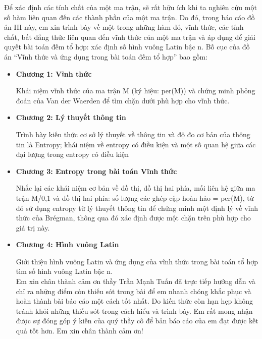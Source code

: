 \documentclass[a4paper, 12pt]{report}
\begin{document}
Để xác định các tính chất của một ma trận, sẽ rất hữu ích khi ta nghiên cứu một số hàm liên quan đến các thành phần của một ma trận. Do đó, trong báo cáo đồ án III này, em xin trình bày về một trong những hàm đó, vĩnh thức, các tính chất, bất đẳng thức liên quan đến vĩnh thức của một ma trận và áp dụng để giải quyết bài toán đếm tổ hợp: xác định số hình vuông Latin bậc n.
Bố cục của đồ án “Vĩnh thức và ứng dụng trong bài toán đếm tổ hợp” bao gồm:
\begin{itemize}
	\item \textbf{Chương 1: Vĩnh thức}
		\par \setlength{\parindent}{5ex} Khái niệm vĩnh thức của ma trận M (ký hiệu: per(M)) và chứng minh phỏng đoán của Van der Waerden để tìm chặn dưới phù hợp cho vĩnh thức.

	\item \textbf{Chương 2: Lý thuyết thông tin} 
	\par \setlength{\parindent}{5ex} Trình bày kiến thức cơ sở lý thuyết về thông tin và độ đo cơ bản của thông tin là Entropy; khái niệm về entropy có điều kiện và một số quan hệ giữa các đại lượng trong entropy có điều kiện

	\item \textbf{Chương 3: Entropy trong bài toán Vĩnh thức}
	\par \setlength{\parindent}{5ex} Nhắc lại các khái niệm cơ bản về đồ thị, đồ thị hai phía, mối liên hệ giữa ma trận M/{0,1} và đồ thị hai phía: số lượng các ghép cặp hoàn hảo = per(M), từ đó sử dụng entropy từ lý thuyết thông tin để chứng minh một định lý về vĩnh thức của  Brégman, thông qua đó xác định được một chặn trên phù hợp cho giá trị này.
	\item \textbf{Chương 4: Hình vuông Latin}
	\par \setlength{\parindent}{5ex} Giới thiệu hình vuông Latin và ứng dụng của vĩnh thức trong bài toán tổ hợp tìm số hình vuông Latin bậc n. \\ 
	Em xin chân thành cảm ơn thầy Trần Mạnh Tuấn đã trực tiếp hướng dẫn và chỉ ra những điểm còn thiếu sót trong bài để em nhanh chóng khắc phục và hoàn thành bài báo cáo một cách tốt nhất.
	Do kiến thức còn hạn hẹp không tránh khỏi những thiếu sót trong cách hiểu và trình bày. Em rất mong nhận được sự đóng góp ý kiến của quý thầy cô để bản báo cáo của em đạt được kết quả tốt hơn.
	Em xin chân thành cảm ơn!



\end{itemize}
\end{document}
